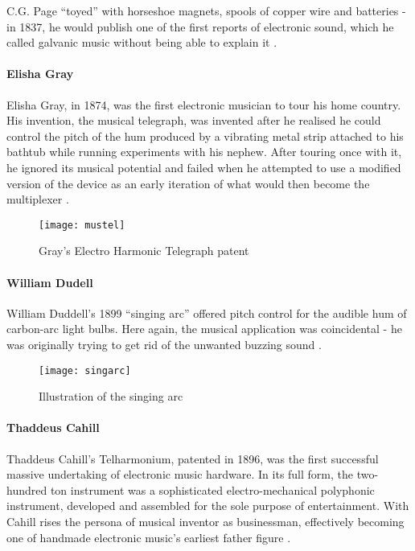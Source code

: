 	C.G. Page “toyed” with horseshoe magnets, spools of copper wire and batteries - in 1837, he would publish one of the first reports of electronic sound, which he called galvanic music without being able to explain it \citep{page1837}. 
	
\paragraph{Elisha Gray}

	Elisha Gray, in 1874, was the first electronic musician to tour his home country. His invention, the musical telegraph, was invented after he realised he could control the pitch of the hum produced by a vibrating metal strip attached to his bathtub while running experiments with his nephew. After touring once with it, he ignored its musical potential and failed when he attempted to use a modified version of the device as an early iteration of what would then become the multiplexer \citep{holmes2002}. 
	
	\begin{figure}[h!]
	  \caption{Gray's Electro Harmonic Telegraph patent}
	  \centering
	    \texttt{[image: mustel]}
	\end{figure}
	
\paragraph{William Dudell}

	William Duddell’s 1899 ``singing arc'' offered pitch control for the audible hum of carbon-arc light bulbs. Here again, the musical application was coincidental - he was originally trying to get rid of the unwanted buzzing sound \citep{nasmyth1908,holmes2002}. 
	
	\begin{figure}[h!]
	  \caption{Illustration of the singing arc}
	  \centering
	    \texttt{[image: singarc]}
	\end{figure}

\paragraph{Thaddeus Cahill}

	Thaddeus Cahill’s Telharmonium, patented in 1896, was the first successful massive undertaking of electronic music hardware. In its full form, the two-hundred ton instrument was a sophisticated electro-mechanical polyphonic instrument, developed and assembled for the sole purpose of entertainment. With Cahill rises the persona of musical inventor as businessman, effectively becoming one of handmade electronic music’s earliest father figure \citep{holmes2002}. 
	
